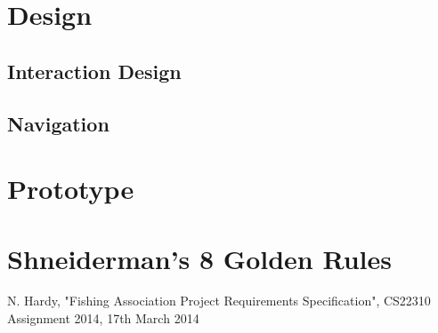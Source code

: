 \documentclass{article}
\begin{document}
\section{Design}
\subsection{Interaction Design}
\subsection{Navigation}



\section{Prototype}


\section{Shneiderman’s 8 Golden Rules}

\clearpage


\begin{thebibliography}{1}

 N. Hardy, "Fishing Association Project Requirements Specification", CS22310 Assignment 2014, 17th March 2014




\end{thebibliography}
\end{document}
